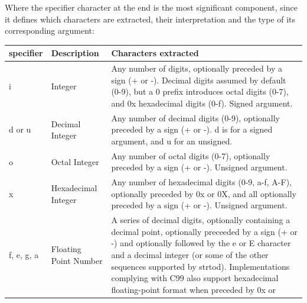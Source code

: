 \documentclass[10pt]{article}
\begin{document}
Where the specifier character at the end is the most significant component,
since it defines which characters are extracted, their interpretation and the
type of its corresponding argument:

\begin{center}
    \begin{tabularx}{\linewidth}{|l|l|*{1}{>{\RaggedRight\arraybackslash}X|}}
        \hline
        \textbf{specifier} & \textbf{Description} & \textbf{Characters extracted} \\
        \hline
        i & Integer & Any number of digits, optionally preceded by a sign (+ or
                        -). Decimal digits assumed by default (0-9), but a 0
                        prefix introduces octal digits (0-7), and 0x hexadecimal
                        digits (0-f). Signed argument. \\
        \hline
        d or u & Decimal Integer & Any number of decimal digits (0-9),
                                    optionally preceded by a sign (+ or -). d
                                    is for a signed argument, and u for an
                                    unsigned. \\
        \hline
        o & Octal Integer & Any number of octal digits (0-7), optionally
                            preceded by a sign (+ or -). Unsigned argument. \\
        \hline
        x & Hexadecimal Integer & Any number of hexadecimal digits (0-9, a-f,
                                    A-F), optionally preceded by 0x or 0X, and
                                    all optionally preceded by a sign (+ or -).
                                    Unsigned argument. \\
        \hline
        f, e, g, a & Floating Point Number & A series of decimal digits,
                                                optionally containing a decimal
                                                point, optionally preceeded by a
                                                sign (+ or -) and optionally
                                                followed by the e or E character
                                                and a decimal integer (or some
                                                of the other sequences supported
                                                by strtod). Implementations
                                                complying with C99 also support
                                                hexadecimal floating-point
                                                format when preceded by 0x or

\end{tabularx}
\end{center}
\end{document}
